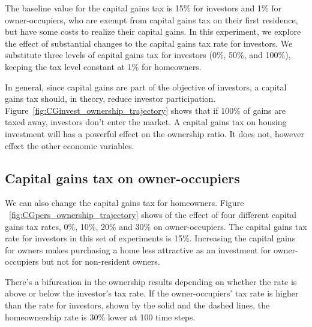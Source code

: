 The baseline value for the capital gains tax is 15\% for investors and 1\% for owner-occupiers, who are  exempt from capital gains tax on their first residence, but have some costs to realize their capital gains. In this experiment, we explore the effect of substantial changes to the capital gains tax rate for investors. 
We substitute three  levels  of capital gains tax for investors (0\%, 50\%, and 100\%), keeping the tax level constant at 1\% for homeowners.

In general, since capital gains are part of the objective of investors, a capital gains tax should, in theory, reduce investor participation. Figure~\ref{fig:CGinvest_ownership_trajectory} shows that if 100\% of gains are taxed away, investors don't enter the market. A capital gains tax on housing investment will has a powerful effect on the ownership ratio. It does not, however effect the other economic variables. %

\newpage
\subsection{Capital gains tax on owner-occupiers}
We can also change the capital gains tax for homeowners. 
Figure ~\ref{fig:CGpers_ownership_trajectory} shows of the effect of four different capital gains tax rates, 0\%, 10\%, 20\% and 30\% on owner-occupiers. The capital gains tax rate for investors in this set of experiments is 15\%. Increasing the capital gains for owners makes purchasing a home less attractive as an investment for owner-occupiers but not for non-resident owners. %


There's a bifurcation in the ownership results depending on whether the rate is above or below the investor's tax rate.  If the owner-occupiers' tax rate is higher than the rate for investors,  shown by the solid and the dashed lines,  the homeownership rate is  30\% lower at 100 time steps. 


